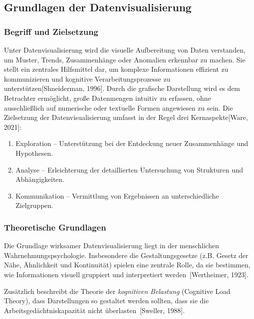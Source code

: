 \subsection{Grundlagen der Datenvisualisierung}
\label{subsec:grundlagen-der-datenvisualisierung}

\subsubsection{Begriff und Zielsetzung}

Unter Datenvisualisierung wird die visuelle Aufbereitung von Daten verstanden, um Muster, Trends, Zusammenhänge
oder Anomalien erkennbar zu machen.
Sie stellt ein zentrales Hilfsmittel dar, um komplexe Informationen effizient zu kommunizieren und kognitive
Verarbeitungsprozesse zu unterstützen[Shneiderman, 1996].
Durch die grafische Darstellung wird es dem Betrachter ermöglicht, große Datenmengen intuitiv zu erfassen,
ohne ausschließlich auf numerische oder textuelle Formen angewiesen zu sein.
Die Zielsetzung der Datenvisualisierung umfasst in der Regel drei Kernaspekte[Ware, 2021]:

\begin{enumerate}

\item
Exploration – Unterstützung bei der Entdeckung neuer Zusammenhänge und Hypothesen.
\item
Analyse – Erleichterung der detaillierten Untersuchung von Strukturen und Abhängigkeiten.
\item
Kommunikation – Vermittlung von Ergebnissen an unterschiedliche Zielgruppen.

\end{enumerate}

\subsubsection{Theoretische Grundlagen}

Die Grundlage wirksamer Datenvisualisierung liegt in der menschlichen Wahrnehmungspsychologie.
Insbesondere die Gestaltungsgesetze (z.B. Gesetz der Nähe, Ähnlichkeit und Kontinuität) spielen eine zentrale Rolle, da sie bestimmen, wie Informationen visuell gruppiert und interpretiert werden [Wertheimer, 1923].

Zusätzlich beschreibt die Theorie der \textit{kognitiven Belastung} (Cognitive Load Theory), dass Darstellungen so gestaltet werden sollten, dass sie die Arbeitsgedächtniskapazität nicht überlasten [Sweller, 1988].



